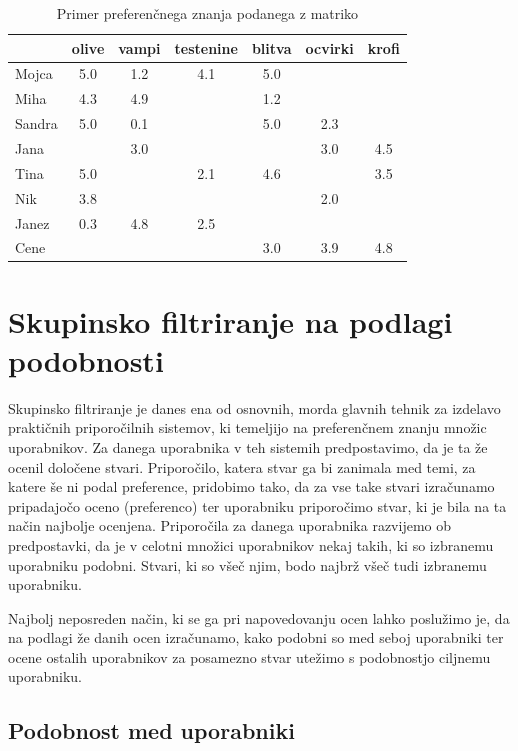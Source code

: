 \begin{table}
\caption{Primer preferenčnega znanja podanega z matriko}
\label{t:pref-matrika}
\begin{center}
\begin{tabular}{lcccccc}
\toprule
& olive & vampi & testenine & blitva & ocvirki & krofi \\
\midrule
Mojca & 5.0 & 1.2 & 4.1 & 5.0 & & \\
Miha & 4.3 & 4.9 & & 1.2 & & \\
Sandra & 5.0 & 0.1 & & 5.0 & 2.3 & \\
Jana & & 3.0 & & & 3.0 & 4.5 \\
Tina & 5.0 & & 2.1 & 4.6 & & 3.5 \\
Nik & 3.8 & & & & 2.0 & \\
Janez & 0.3 & 4.8 & 2.5 & & & \\
Cene & & & & 3.0 & 3.9 & 4.8 \\
\bottomrule
\end{tabular}
\end{center}
\end{table}

\section{Skupinsko filtriranje na podlagi podobnosti}

Skupinsko filtriranje  je danes ena od osnovnih, morda glavnih tehnik za izdelavo praktičnih priporočilnih sistemov, ki temeljijo na preferenčnem znanju množic uporabnikov. Za danega uporabnika v teh sistemih predpostavimo, da je ta že ocenil določene stvari. Priporočilo, katera stvar ga bi zanimala med temi, za katere še ni podal preference, pridobimo tako, da za vse take stvari izračunamo pripadajočo oceno (preferenco) ter uporabniku priporočimo stvar, ki je bila na ta način najbolje ocenjena. Priporočila za danega uporabnika razvijemo ob predpostavki, da je v celotni množici uporabnikov nekaj takih, ki so izbranemu uporabniku podobni. Stvari, ki so všeč njim, bodo najbrž všeč tudi izbranemu uporabniku. 

Najbolj neposreden način, ki se ga pri napovedovanju ocen lahko poslužimo je, da na podlagi že danih ocen izračunamo, kako podobni so med seboj uporabniki ter ocene ostalih uporabnikov za posamezno stvar utežimo s podobnostjo ciljnemu uporabniku. 

\subsection{Podobnost med uporabniki}

